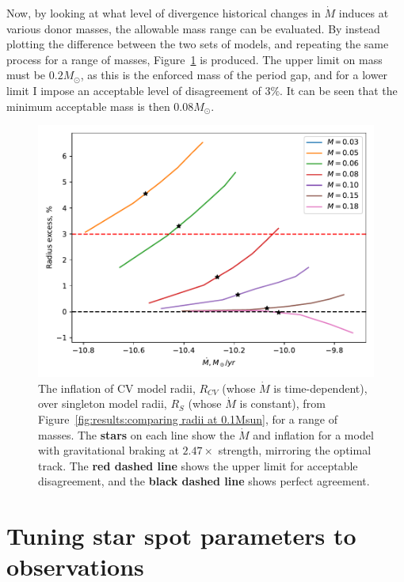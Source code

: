 Now, by looking at what level of divergence historical changes in $\dot M$ induces at various donor masses, the allowable mass range can be evaluated.
By instead plotting the difference between the two sets of models, and repeating the same process for a range of masses, Figure~\ref{fig:results:comparing radii over a range of masses} is produced.
The upper limit on mass must be $0.2 M_\odot$, as this is the enforced mass of the period gap, and for a lower limit I impose an acceptable level of disagreement of $3\%$. It can be seen that the minimum acceptable mass is then $0.08 M_\odot$.
\begin{figure}
    \centering
    \includegraphics[width=\textwidth]{figures/modelling/compare_multiple_mass_with_CV_K11_fig1a.pdf}
    \caption{The inflation of CV model radii, $R_{CV}$ (whose $\dot M$ is time-dependent), over singleton model radii, $R_S$ (whose $\dot M$ is constant), from Figure~\ref{fig:results:comparing radii at 0.1Msun}, for a range of masses. The {\bf stars} on each line show the $\dot M$ and inflation for a model with gravitational braking at $2.47\times$ strength, mirroring the \citet{knigge11} optimal track. The {\bf red dashed line} shows the upper limit for acceptable disagreement, and the {\bf black dashed line} shows perfect agreement.}
    \label{fig:results:comparing radii over a range of masses}
\end{figure}


\newpage
\section{Tuning star spot parameters to observations}
\label{sect:modelling:tuning star spots to observations}

